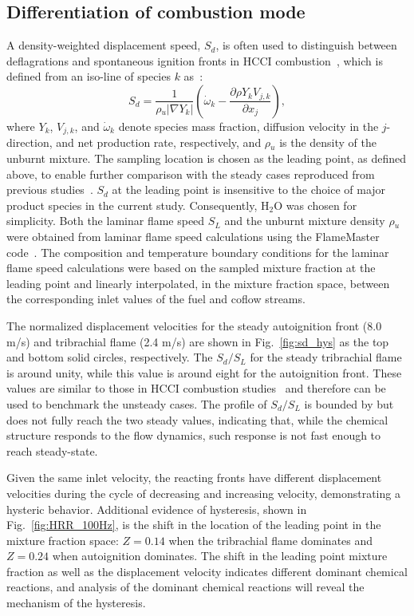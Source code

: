 \documentclass{essci}
\def\pp#1#2{\frac{\partial #1}{\partial #2}}
\begin{document}
\subsection{Differentiation of combustion mode}

A density-weighted displacement speed, $S_d$, is often used to distinguish between deflagrations and spontaneous ignition fronts in HCCI combustion~\cite{yoo13}, which is defined from an iso-line of species $k$ as~\cite{ruetsch95,im99}:
\begin{equation*}
S_d = \frac{1}{\rho{_u} |\nabla Y_k|} \left(\dot{\omega}{_k} - \pp{\rho Y_k V_{j,k}}{x_j} \right),
\end{equation*}
where $Y_k$, $V_{j,k}$, and $\dot{\omega}{_k}$ denote species mass fraction, diffusion velocity in the $j$-direction, and net production rate, respectively, and $\rho {_u}$ is the density of the unburnt mixture.  The sampling location is chosen as the leading point, as defined above, to enable further comparison with the steady cases reproduced from previous studies~\cite{deng15b}.  $S_d$ at the leading point is insensitive to the choice of major product species in the current study.  Consequently, H$_2$O was chosen for simplicity.  Both the laminar flame speed $S_L$ and the unburnt mixture density $\rho {_u}$ were obtained from laminar flame speed calculations using the FlameMaster code~\cite{flamemaster}.  The composition and temperature boundary conditions for the laminar flame speed calculations were based on the sampled mixture fraction at the leading point and linearly interpolated, in the mixture fraction space, between the corresponding inlet values of the fuel and coflow streams.

The normalized displacement velocities for the steady autoignition front (8.0 m/s) and tribrachial flame (2.4 m/s) are shown in Fig.~\ref{fig:sd_hys} as the top and bottom solid circles, respectively.  The $S_d/S_L$ for the steady tribrachial flame is around unity, while this value is around eight for the autoignition front.  These values are similar to those in HCCI combustion studies~\cite{yoo13} and therefore can be used to benchmark the unsteady cases.  The profile of $S_d/S_L$ is bounded by but does not fully reach the two steady values, indicating that, while the chemical structure responds to the flow dynamics, such response is not fast enough to reach steady-state.

Given the same inlet velocity, the reacting fronts have different displacement velocities during the cycle of decreasing and increasing velocity, demonstrating a hysteric behavior.  Additional evidence of hysteresis, shown in Fig.~\ref{fig:HRR_100Hz}, is the shift in the location of the leading point in the mixture fraction space: $Z = 0.14$ when the tribrachial flame dominates and $Z = 0.24$ when autoignition dominates.  The shift in the leading point mixture fraction as well as the displacement velocity indicates different dominant chemical reactions, and analysis of the dominant chemical reactions will reveal the mechanism of the hysteresis.
\end{document}
